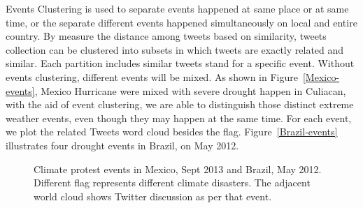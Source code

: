 Events Clustering is used to separate events happened at same place or at same time, or the separate different events happened simultaneously on local and entire country. By measure the distance among tweets based on similarity, tweets collection can be clustered into subsets in which tweets are exactly related and similar. Each partition includes similar tweets stand for a specific event. Without events clustering, different events will be mixed. As shown in Figure~\ref{Mexico-events}, Mexico Hurricane were mixed with severe drought happen in Culiacan, with the aid of event clustering, we are able to distinguish those distinct extreme weather events, even though they may happen at the same time. For each event, we plot the related Tweets word cloud besides the flag. Figure~\ref{Brazil-events} illustrates four drought events in Brazil, on May 2012.

\begin{figure}[th]
	\centering
	\caption{Climate protest events in Mexico, Sept 2013 and Brazil, May 2012. Different flag represents different climate disasters. The adjacent world cloud shows Twitter discussion as per that event. }
\label{Twitter-events}
\end{figure}


